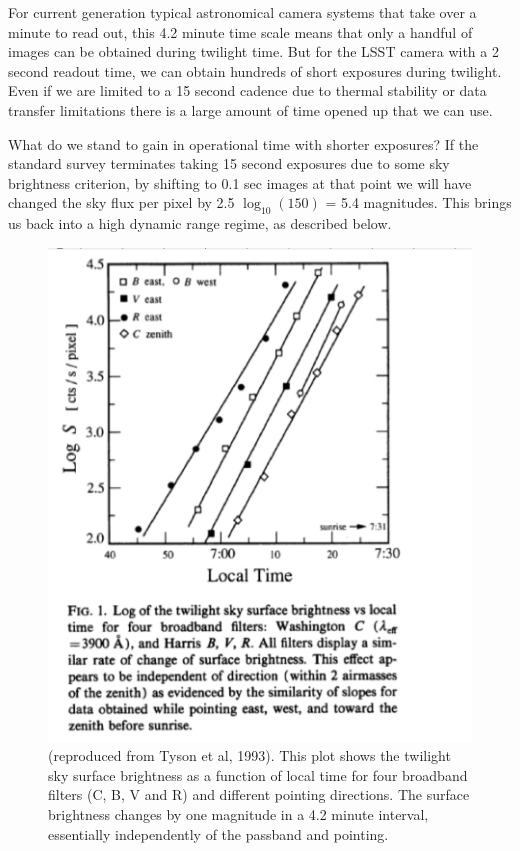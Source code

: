 For current generation typical astronomical camera systems that take
over a minute to read out, this 4.2 minute time scale means that only a
handful of images can be obtained during twilight time. But for the LSST
camera with a 2 second readout time, we can obtain hundreds of short
exposures during twilight. Even if we are limited to a 15 second cadence
due to thermal stability or data transfer limitations there is a large
amount of time opened up that we can use.

What do we stand to gain in operational time with shorter exposures? If
the standard survey terminates taking 15 second exposures due to some
sky brightness criterion, by shifting to 0.1 sec images at that point we
will have changed the sky flux per pixel by 2.5 $\log_{10}(150)$ = 5.4
magnitudes. This brings us back into a high dynamic range regime, as
described below.

\begin{figure}[htbp]
\begin{center}
\includegraphics[trim = 0 7cm 0 1mm, clip, width=\textwidth]{figs/Stubbs_Fig1.pdf}
\caption{(reproduced from Tyson et al, 1993). This plot shows the
  twilight sky surface brightness as a function of local time for four
  broadband filters (C, B, V and R) and different pointing directions.
  The surface brightness changes by one magnitude in a 4.2 minute interval,
essentially independently of the passband and pointing.}
\label{fig:Tyson}
\end{center}
\end{figure}

